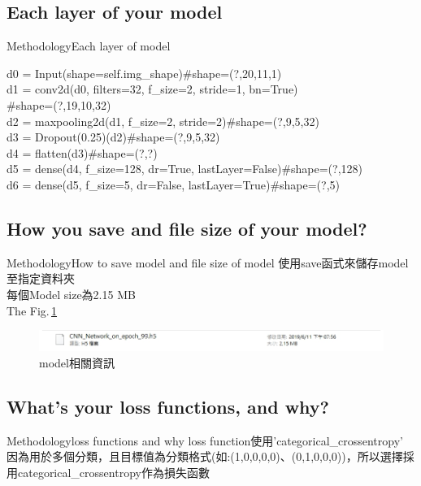 \documentclass{beamer}
\begin{document}
\begin{CJK}{UTF8}{nkai}
\subsection{Each layer of your model}
\begin{frame}{Methodology}{Each layer of model}

d0 = Input(shape=self.img\_shape)\#shape=(?,20,11,1)\\
d1 = conv2d(d0, filters=32, f\_size=2, stride=1, bn=True)\\
\qquad\quad\#shape=(?,19,10,32)\\
d2 = maxpooling2d(d1, f\_size=2, stride=2)\#shape=(?,9,5,32)\\
d3 = Dropout(0.25)(d2)\#shape=(?,9,5,32)\\
d4 = flatten(d3)\#shape=(?,?)\\
d5 = dense(d4, f\_size=128, dr=True, lastLayer=False)\#shape=(?,128)\\
d6 = dense(d5, f\_size=5, dr=False, lastLayer=True)\#shape=(?,5)\\

\end{frame}

\subsection{How you save and file size of your model?}

\subsection{What's your loss functions, and why?}
\begin{frame}{Methodology}{loss functions and why}
	loss function使用'categorical\_crossentropy'\\
	因為用於多個分類，且目標值為分類格式(如:(1,0,0,0,0)、(0,1,0,0,0))，所以選擇採用categorical\_crossentropy作為損失函數
\end{frame}

\end{CJK}
\end{document}
